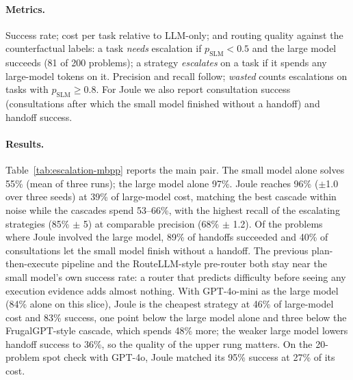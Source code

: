 \paragraph{Metrics.}
Success rate; cost per task relative to LLM-only; and routing quality against the counterfactual labels:
a task \emph{needs} escalation if $p_{\text{SLM}} < 0.5$ and the large model succeeds (81 of 200 problems);
a strategy \emph{escalates} on a task if it spends any large-model tokens on it.
Precision and recall follow; \emph{wasted} counts escalations on tasks with $p_{\text{SLM}} \geq 0.8$.
For Joule we also report consultation success (consultations after which the small model finished without a handoff) and handoff success.

\paragraph{Results.}
Table~\ref{tab:escalation-mbpp} reports the main pair.
The small model alone solves 55\% (mean of three runs); the large model alone 97\%.
Joule reaches 96\% ($\pm$1.0 over three seeds) at 39\% of large-model cost, matching the best cascade within noise while the cascades spend 53--66\%, with the highest recall of the escalating strategies (85\% $\pm$ 5) at comparable precision (68\% $\pm$ 1.2).
Of the problems where Joule involved the large model, 89\% of handoffs succeeded and 40\% of consultations let the small model finish without a handoff.
The previous plan-then-execute pipeline and the RouteLLM-style pre-router both stay near the small model's own success rate: a router that predicts difficulty before seeing any execution evidence adds almost nothing.
With GPT-4o-mini as the large model (84\% alone on this slice), Joule is the cheapest strategy at 46\% of large-model cost and 83\% success, one point below the large model alone and three below the FrugalGPT-style cascade, which spends 48\% more; the weaker large model lowers handoff success to 36\%, so the quality of the upper rung matters.
On the 20-problem spot check with GPT-4o, Joule matched its 95\% success at 27\% of its cost.

